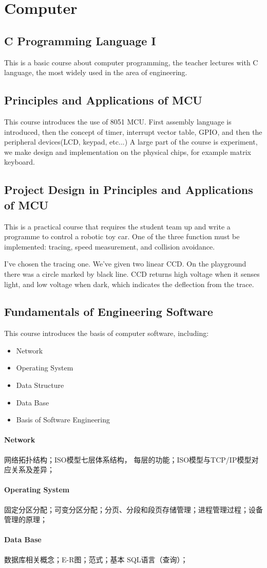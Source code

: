 \section{Computer}
\subsection{C Programming Language I}
This is a basic course about computer programming, the teacher lectures with C language, the most widely used in the area of engineering.

\subsection{Principles and Applications of MCU}
This course introduces the use of 8051 MCU. First assembly language is introduced, then the concept of timer, interrupt vector table, GPIO, and then the peripheral devices(LCD, keypad, etc...) A large part of the course is experiment, we make design and implementation on the physical chips, for example matrix keyboard.

\subsection{Project Design in Principles and Applications of MCU}
This is a practical course that requires the student team up and write a programme to control a robotic toy car. One of the three function must be implemented: tracing, speed measurement, and collision avoidance.

I've chosen the tracing one. We've given two linear CCD. On the playground there was a circle marked by black line. CCD returns high voltage when it senses light, and low voltage when dark, which indicates the deflection from the trace.

\subsection{Fundamentals of Engineering Software}
This course introduces the basis of computer software, including:
\begin{itemize}
  \item Network
  \item Operating System
  \item Data Structure
  \item Data Base
  \item Basis of Software Engineering
\end{itemize}

\paragraph{Network}
网络拓扑结构；ISO模型七层体系结构， 每层的功能；ISO模型与TCP/IP模型对应关系及差异；

\paragraph{Operating System}
固定分区分配；可变分区分配；分页、分段和段页存储管理；进程管理过程；设备管理的原理；

\paragraph{Data Base}
数据库相关概念；E-R图；范式；基本 SQL语言（查询）；